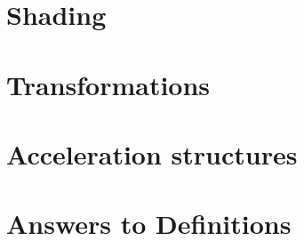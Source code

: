 \documentclass{article}
\begin{document}
\section{Shading}
\label{sec:shading}


\section{Transformations}
\label{sec:transform}


\section{Acceleration structures}
\label{sec:accel}



\section{Answers to Definitions}





\end{document}
